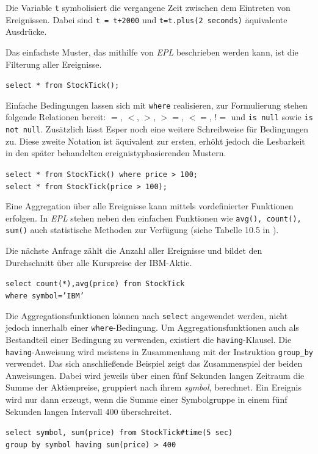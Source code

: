 \documentclass{acm_proc_article-sp}
\begin{document}
Die Variable \texttt{t} symbolisiert die vergangene Zeit zwischen dem Eintreten von 
Ereignissen. Dabei sind \texttt{t = t+2000} und \texttt{t=t.plus(2 seconds)} äquivalente 
Ausdrücke. 

\newpage
Das einfachste Muster, das mithilfe von \textit{EPL} beschrieben werden kann, ist die 
Filterung aller Ereignisse.

\texttt{select * from StockTick();}

Einfache Bedingungen lassen sich mit \texttt{where} realisieren, zur Formulierung stehen 
folgende Relationen bereit: $=$, $<$, $>$, $>=$, $<=$, $!=$ und  \texttt{is null} sowie 
\texttt{is not null}. Zusätzlich lässt Esper 
noch eine weitere Schreibweise für Bedingungen zu. Diese zweite Notation ist 
äquivalent zur ersten, erhöht jedoch die 
Lesbarkeit in den später behandelten 
ereignistypbasierenden Mustern.

\texttt{select * from StockTick() where price > 100;}\\
\texttt{select * from StockTick(price > 100);}


Eine Aggregation über alle Ereignisse kann mittels vordefinierter Funktionen erfolgen. In
\textit{EPL} 
stehen neben den einfachen Funktionen wie \texttt{avg(), count(), sum()} auch 
statistische Methoden zur Verfügung (siehe Tabelle 10.5 in \cite{esper-reference}).

Die nächste Anfrage zählt die Anzahl aller Ereignisse und bildet den Durchschnitt über 
alle Kurspreise der IBM-Aktie.

\texttt{select  count(*),avg(price) from StockTick\\where symbol='IBM'}


Die Aggregationsfunktionen können nach \texttt{select} angewendet werden, 
nicht jedoch innerhalb einer \texttt{where}-Bedingung. Um Aggregationsfunktionen auch 
als Bestandteil einer Bedingung zu verwenden, existiert die \texttt{having}-Klausel.
Die \texttt{having}-Anweisung wird meistens in Zusammenhang mit der Instruktion 
\texttt{group\_by} verwendet. Das sich anschließende Beispiel zeigt das Zusammenspiel der 
beiden Anweisungen. Dabei wird jeweils über einen fünf Sekunden langen Zeitraum die Summe 
der Aktienpreise, gruppiert nach ihrem \emph{symbol}, berechnet. Ein Ereignis wird nur 
dann erzeugt, wenn die Summe einer Symbolgruppe in einem fünf Sekunden langen Intervall 
400 überschreitet.

\texttt{select symbol, sum(price) 
from StockTick\#time(5 sec)\\
group by symbol
having sum(price) > 400}
 
\end{document}
